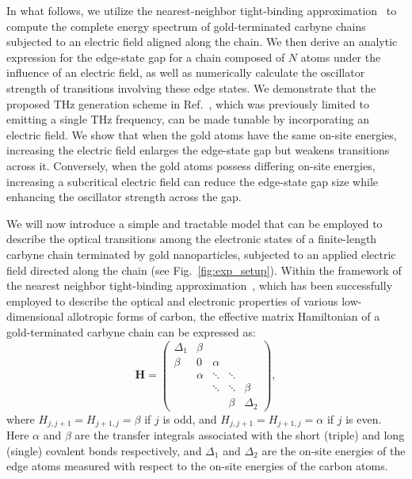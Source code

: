 \documentclass[
preprint,
 amsmath,amssymb,
 aps,
]{revtex4-2}
\begin{document}
In what follows, we utilize the nearest-neighbor tight-binding approximation~\cite{dresselhaus1998physical} to compute the complete energy spectrum of gold-terminated carbyne chains subjected to an electric field aligned along the chain. We then derive an analytic expression for the edge-state gap for a chain composed of $N$ atoms under the influence of an electric field, as well as numerically calculate the oscillator strength of transitions involving these edge states. We demonstrate that the proposed THz generation scheme in Ref.~\cite{hartmann2021terahertz}, which was previously limited to emitting a single THz frequency, can be made tunable by incorporating an electric field. We show that when the gold atoms have the same on-site energies, increasing the electric field enlarges the edge-state gap but weakens transitions across it. Conversely, when the gold atoms possess differing on-site energies, increasing a subcritical electric field can reduce the edge-state gap size while enhancing the oscillator strength across the gap.



We will now introduce a simple and tractable model that can be employed to describe the optical transitions among the electronic states of a finite-length carbyne chain terminated by gold nanoparticles, subjected to an applied electric field directed along the chain (see Fig.~\ref{fig:exp_setup}). Within the framework of the nearest neighbor tight-binding approximation~\cite{dresselhaus1998physical}, which has been successfully employed to describe the optical and electronic properties of various low-dimensional allotropic forms of carbon, the effective matrix Hamiltonian of a gold-terminated carbyne chain can be expressed as:~\cite{hartmann2021terahertz}
\begin{equation}
\mathbf{H}=\left(
\begin{array}{ccccc}
\Delta_{1} & \beta\\
\beta & 0 & \alpha\\
 & \alpha & \ddots & \ddots\\
 &  & \ddots & \ddots & \beta\\
 &  &  & \beta & \Delta_{2}
\end{array}
\right),
\label{eq:Ham_0}
\end{equation}
where $H_{j,j+1}=H_{j+1,j}=\beta$ if $j$ is odd, and $H_{j,j+1}=H_{j+1,j}=\alpha$ if $j$ is even. Here $\alpha$ and $\beta$ are the transfer integrals associated with the short (triple) and long (single) covalent bonds respectively, and $\Delta_{1}$ and $\Delta_{2}$ are the on-site energies of the edge atoms measured with respect to the on-site energies of the carbon atoms. 
\end{document}

